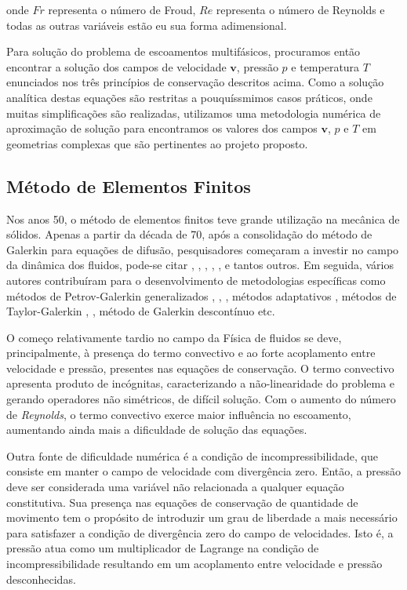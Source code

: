\documentclass[a4paper,portuges,12pt]{article}
\newcommand{\vvet}{\mathbf{v}}
\begin{document}
\noindent onde $Fr$ representa o número de Froud, $Re$ representa o
número de Reynolds e todas as outras variáveis estão eu sua forma
adimensional.

Para solução do problema de escoamentos multifásicos, procuramos então
encontrar a solução dos campos de velocidade $\vvet$, pressão $p$ e
temperatura $T$ enunciados nos três princípios de conservação descritos
acima. Como a solução analítica destas equações são restritas a
pouquíssmimos casos práticos, onde muitas simplificações são realizadas,
utilizamos uma metodologia numérica de aproximação de solução para
encontramos os valores dos campos $\vvet$, $p$ e $T$ em geometrias
complexas que são pertinentes ao projeto proposto. 

\subsection{Método de Elementos Finitos}
Nos anos 50, o método de elementos finitos teve grande utilização na
mecânica de sólidos.  Apenas a partir da década de 70, após a
consolidação do método de Galerkin para equações de difusão,
pesquisadores começaram a investir no campo da dinâmica dos fluidos,
pode-se citar \cite{zienkiewicz1965}, \cite{oden1972}, \cite{oden1998},
\cite{chung1978}, \cite{hughes1982}, \cite{pironneau1989} e tantos
outros.  Em seguida, vários autores contribuíram para o desenvolvimento
de metodologias específicas como métodos de Petrov-Galerkin
generalizados \cite{heinrich1977}, \cite{hughes1986},
\cite{johnson1987}, métodos adaptativos \cite{oden1989}, métodos de
Taylor-Galerkin \cite{donea1984}, \cite{lohner1985}, método de Galerkin
descontínuo \cite{oden1998} etc.

O começo relativamente tardio no campo da Física de fluidos se deve,
principalmente, à presença do termo convectivo e ao forte acoplamento
entre velocidade e pressão, presentes nas equações de conservação. O
termo convectivo apresenta produto de incógnitas, caracterizando a
não-linearidade do problema e gerando operadores não simétricos, de
difícil solução.  Com o aumento do número de \emph{Reynolds}, o termo
convectivo exerce maior influência no escoamento, aumentando ainda mais
a dificuldade de solução das equações.

Outra fonte de dificuldade numérica é a condição de incompressibilidade,
que consiste em manter o campo de velocidade com divergência zero.
Então, a pressão deve ser considerada uma variável não relacionada a
qualquer equação constitutiva.  Sua presença nas equações de conservação
de quantidade de movimento tem o propósito de introduzir um grau de
liberdade a mais necessário para satisfazer a condição de divergência
zero do campo de velocidades.  Isto é, a pressão atua como um
multiplicador de Lagrange na condição de incompressibilidade resultando
em um acoplamento entre velocidade e pressão desconhecidas.
\end{document}
